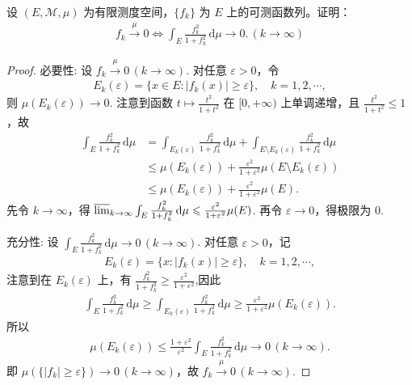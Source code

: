 \documentclass[../../main.tex]{subfiles}%
\begin{document}
\begin{example}
设 $(E, \mathscr{M}, \mu)$ 为有限测度空间，$\{f_k\}$ 为 $E$ 上的可测函数列。证明：
\begin{align}
f_k \xrightarrow{\mu} 0 \iff \int_E \frac{f_k^2}{1 + f_k^2} \, \mathrm{d}\mu \to 0. \,(k\to \infty)\label{measconv}
\end{align}
\end{example}
\begin{proof}

{\heiti 必要性:} 设 $f_k \xrightarrow{\mu} 0\,(k\to \infty)$. 对任意 $\varepsilon>0$，令
\begin{align*}
E_k(\varepsilon) = \{x\in E: |f_k(x)| \geqslant \varepsilon\},\quad k=1,2,\cdots,
\end{align*}
则 $\mu(E_k(\varepsilon)) \to 0$. 注意到函数 $t\mapsto \frac{t^2}{1+t^2}$ 在 $[0,+\infty)$ 上单调递增，且 $\frac{t^2}{1+t^2} \leqslant 1$，故
\begin{align*}
\int_E \frac{f_k^2}{1+f_k^2} \, \mathrm{d}\mu
&= \int_{E_k(\varepsilon)} \frac{f_k^2}{1+f_k^2} \, \mathrm{d}\mu
+ \int_{E\setminus E_k(\varepsilon)} \frac{f_k^2}{1+f_k^2} \, \mathrm{d}\mu \\
&\leqslant \mu(E_k(\varepsilon)) + \frac{\varepsilon^2}{1+\varepsilon^2} \mu(E\setminus E_k(\varepsilon)) \\
&\leqslant \mu(E_k(\varepsilon)) + \frac{\varepsilon^2}{1+\varepsilon^2} \mu(E).
\end{align*}
先令 $k\to\infty$，得 $\varlimsup_{k\to\infty} \int_E \frac{f_k^2}{1+f_k^2} \, \mathrm{d}\mu \leqslant \frac{\varepsilon^2}{1+\varepsilon^2} \mu(E)$. 再令 $\varepsilon\to 0$，得极限为 $0$. 

{\heiti 充分性:} 设 $\int_E \frac{f_k^2}{1+f_k^2} \, \mathrm{d}\mu \to 0\,(k\to \infty)$. 对任意 $\varepsilon>0$，记
\begin{align*}
E_k(\varepsilon) = \{x: |f_k(x)| \geqslant \varepsilon\},\quad k=1,2,\cdots,
\end{align*}
注意到在 $E_k(\varepsilon)$ 上，有 $\frac{f_k^2}{1+f_k^2} \geqslant \frac{\varepsilon^2}{1+\varepsilon^2}$,因此
\begin{align*}
\int_E \frac{f_k^2}{1+f_k^2} \, \mathrm{d}\mu
\geqslant \int_{E_k(\varepsilon)} \frac{f_k^2}{1+f_k^2} \, \mathrm{d}\mu
\geqslant \frac{\varepsilon^2}{1+\varepsilon^2} \mu(E_k(\varepsilon)).
\end{align*}
所以
\begin{align*}
\mu(E_k(\varepsilon)) \leqslant \frac{1+\varepsilon^2}{\varepsilon^2} \int_E \frac{f_k^2}{1+f_k^2} \, \mathrm{d}\mu \to 0\,(k\to \infty).
\end{align*}
即 $\mu(\{|f_k|\geqslant \varepsilon\}) \to 0\,(k\to \infty)$，故 $f_k \xrightarrow{\mu} 0\,(k\to \infty)$.
\end{proof}
\end{document}
